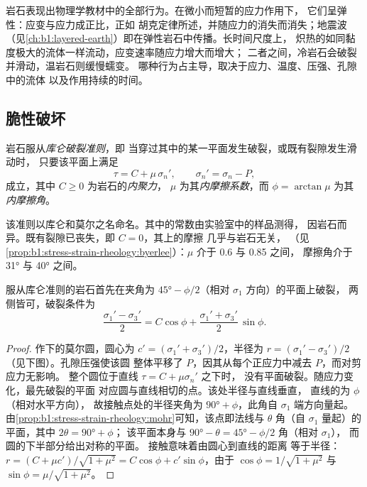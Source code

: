 岩石表现出物理学教材中的全部行为。在微小而短暂的应力作用下，
它们呈弹性：应变与应力成正比，正如
胡克定律所述，并随应力的消失而消失；地震波
（见\cref{ch:b1:layered-earth}）即在弹性岩石中传播。长时间尺度上，
炽热的如同黏度极大的流体一样流动，应变速率随应力增大而增大；
二者之间，冷岩石会破裂并滑动，温岩石则缓慢蠕变。
哪种行为占主导，取决于应力、温度、压强、孔隙中的流体
以及作用持续的时间。

\subsection*{脆性破坏}

\begin{definition}[库仑破裂准则]\label{def:b1:stress-strain-rheology:coulomb}
岩石服从\emph{库仑破裂准则}，即
当穿过其中的某一平面发生破裂，或既有裂隙发生滑动时，
只要该平面上满足
\[
  \tau = C + \mu\,\sigma_n' , \qquad \sigma_n' = \sigma_n - P ,
\]
成立，其中 $C \ge 0$ 为岩石的\emph{内聚力}，
$\mu$ 为其\emph{内摩擦系数}，而
$\phi = \arctan\mu$ 为其
\emph{内摩擦角}。
\end{definition}

该准则以库仑和莫尔之名命名。其中的常数由实验室中的样品测得，
因岩石而异。既有裂隙已丧失，即 $C = 0$，其上的摩擦
几乎与岩石无关，
（见\cref{prop:b1:stress-strain-rheology:byerlee}）：$\mu$ 介于 0.6 与 0.85 之间，
摩擦角介于 \ang{31} 与
\ang{40} 之间。

\begin{theorem}[破裂角]\label{thm:b1:stress-strain-rheology:failure-angle}
服从库仑准则的岩石首先在夹角为
$\ang{45} - \phi/2$（相对 $\sigma_1$ 方向）的平面上破裂，
两侧皆可，破裂条件为
\[
  \frac{\sigma_1' - \sigma_3'}{2} = C\cos\phi + \frac{\sigma_1' + \sigma_3'}{2}\,\sin\phi .
\]
\end{theorem}

\begin{proof}
作下的莫尔圆，圆心为 $c' =
(\sigma_1'+\sigma_3')/2$，半径为 $r = (\sigma_1'-\sigma_3')/2$
（见下图）。孔隙压强使该圆
整体平移了 $P$，因其从每个正应力中减去 $P$，而对剪应力无影响。
整个圆位于直线 $\tau = C + \mu\sigma_n'$ 之下时，
没有平面破裂。随应力变化，最先破裂的平面
对应圆与直线相切的点。该处半径与直线垂直，
直线的为 $\phi$（相对水平方向），
故接触点处的半径夹角为 $\ang{90} + \phi$，此角自 $\sigma_1$ 端方向量起。
由\cref{prop:b1:stress-strain-rheology:mohr}可知，该点即法线与
$\theta$ 角（自 $\sigma_1$ 量起）的平面，其中 $2\theta = \ang{90} + \phi$；
该平面本身与 $\ang{90} - \theta = \ang{45} - \phi/2$ 角（相对 $\sigma_1$），
而圆的下半部分给出对称的平面。
接触意味着由圆心到直线的距离
等于半径：
$r = (C + \mu c')/\sqrt{1+\mu^2} = C\cos\phi + c'\sin\phi$，由于
$\cos\phi = 1/\sqrt{1+\mu^2}$ 与 $\sin\phi = \mu/\sqrt{1+\mu^2}$。
\end{proof}

